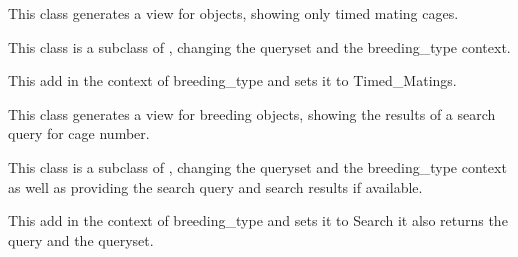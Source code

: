 \documentclass[letterpaper,10pt,english]{sphinxmanual}
\begin{document}

\begin{fulllineitems}
\label{animals:mousedb.animal.views.BreedingListTimedMating}
This class generates a view for {\hyperref[animals:mousedb.animal.models.Breeding]{}} objects, showing only timed mating cages.

This class is a subclass of {\hyperref[animals:mousedb.animal.views.BreedingList]{}}, changing the queryset and the  breeding\_type context.

\begin{fulllineitems}
\label{animals:mousedb.animal.views.BreedingListTimedMating.get_context_data}
This add in the context of breeding\_type and sets it to Timed\_Matings.

\end{fulllineitems}


\end{fulllineitems}


\begin{fulllineitems}
\label{animals:mousedb.animal.views.BreedingSearch}
This class generates a view for breeding objects, showing the results of a search query for cage number.

This class is a subclass of {\hyperref[animals:mousedb.animal.views.BreedingList]{}}, changing the queryset and the  breeding\_type context as well as providing the search query and search results if available.

\begin{fulllineitems}
\label{animals:mousedb.animal.views.BreedingSearch.get_context_data}
This add in the context of breeding\_type and sets it to Search it also returns the query and the queryset.

\end{fulllineitems}


\end{fulllineitems}
\end{document}
